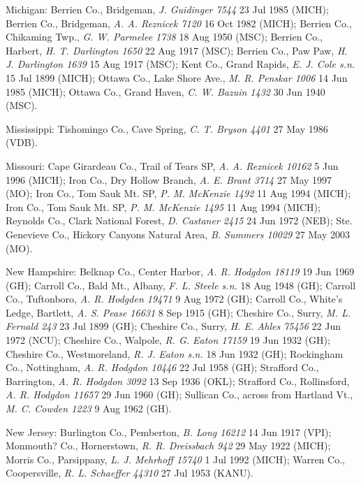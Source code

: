 \documentclass{article}
\begin{document}
Michigan:
Berrien Co., Bridgeman, \textit{J. Guidinger 7544} 23 Jul 1985 (MICH);
Berrien Co., Bridgeman, \textit{A. A. Reznicek 7120} 16 Oct 1982 (MICH);
Berrien Co., Chikaming Twp., \textit{G. W. Parmelee 1738} 18 Aug 1950 (MSC);
Berrien Co., Harbert, \textit{H. T. Darlington 1650} 22 Aug 1917 (MSC);
Berrien Co., Paw Paw, \textit{H. J. Darlington 1639} 15 Aug 1917 (MSC);
Kent Co., Grand Rapids, \textit{E. J. Cole s.n.} 15 Jul 1899 (MICH);
Ottawa Co.,  Lake Shore Ave., \textit{M. R. Penskar 1006} 14 Jun 1985 (MICH);
Ottawa Co., Grand Haven, \textit{C. W. Bazuin 1432} 30 Jun 1940 (MSC).

Mississippi:
Tishomingo Co., Cave Spring, \textit{C. T. Bryson 4401} 27 May 1986 (VDB).

Missouri:
Cape Girardeau Co., Trail of Tears SP, \textit{A. A. Reznicek 10162} 5 Jun 1996 (MICH);
Iron Co., Dry Hollow Branch, \textit{A. E. Brant 3714} 27 May 1997 (MO);
Iron Co., Tom Sauk Mt. SP, \textit{P. M. McKenzie 1492} 11 Aug 1994 (MICH);
Iron Co., Tom Sauk Mt. SP, \textit{P. M. McKenzie 1495} 11 Aug 1994 (MICH);
Reynolds Co., Clark National Forest, \textit{D. Castaner 2415} 24 Jun 1972 (NEB);
Ste. Genevieve Co., Hickory Canyons Natural Area, \textit{B. Summers 10029} 27 May 2003 (MO).

New Hampshire:
Belknap Co., Center Harbor, \textit{A. R. Hodgdon 18119} 19 Jun 1969 (GH);
Carroll Co., Bald Mt., Albany, \textit{F. L. Steele s.n.} 18 Aug 1948 (GH);
Carroll Co., Tuftonboro, \textit{A. R. Hodgden 19471} 9 Aug 1972 (GH);
Carroll Co., White's Ledge, Bartlett, \textit{A. S. Pease 16631} 8 Sep 1915 (GH);
Cheshire Co., Surry, \textit{M. L. Fernald 243} 23 Jul 1899 (GH);
Cheshire Co., Surry, \textit{H. E. Ahles 75456} 22 Jun 1972 (NCU);
Cheshire Co., Walpole, \textit{R. G. Eaton 17159} 19 Jun 1932 (GH);
Cheshire Co., Westmoreland, \textit{R. J. Eaton s.n.} 18 Jun 1932 (GH);
Rockingham Co., Nottingham, \textit{A. R. Hodgdon 10446} 22 Jul 1958 (GH);
Strafford Co., Barrington, \textit{A. R. Hodgdon 3092} 13 Sep 1936 (OKL);
Strafford Co., Rollinsford, \textit{A. R. Hodgdon 11657} 29 Jun 1960 (GH);
Sullican Co., across from Hartland Vt., \textit{M. C. Cowden 1223} 9 Aug 1962 (GH).

New Jersey:
Burlington Co., Pemberton, \textit{B. Long 16212} 14 Jun 1917 (VPI);
Monmouth? Co., Hornerstown, \textit{R. R. Dreissbach 942} 29 May 1922 (MICH);
Morris Co., Parsippany, \textit{L. J. Mehrhoff 15740} 1 Jul 1992 (MICH);
Warren Co., Coopersville, \textit{R. L. Schaeffer 44310} 27 Jul 1953 (KANU).
\end{document}
